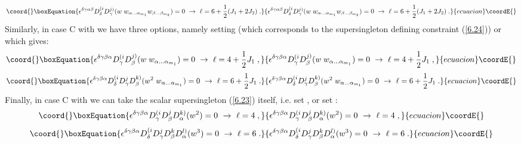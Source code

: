 \documentclass[a4paper,12pt]{article}
\begin{document}
\begin{equation}\coord{}\boxEquation{\label{6.3313}
 \epsilon^{\delta\gamma\alpha\beta}D^{(i}_\delta
D^{j)}_\gamma(w\;w_{\alpha\ldots\alpha_{m_1}} 
w_{\beta\ldots\beta_{m_2}}) = 0\ \rightarrow \ \ell = 6 +{1\over 
2}(J_1+2J_2)\;.
}{\epsilon^{\delta\gamma\alpha\beta}D^{(i}_\delta
D^{j)}_\gamma(w\;w_{\alpha\ldots\alpha_{m_1}} 
w_{\beta\ldots\beta_{m_2}}) = 0\ \rightarrow \ \ell = 6 +{1\over 
2}(J_1+2J_2)\;.
}{ecuacion}\coordE{}\end{equation}
Similarly, in case C with \coordHE{} we have three options, namely 
setting \coordHE{} (which 
corresponds to the supersingleton defining constraint 
(\ref{6.24})) or \coordHE{} which gives:
\begin{equation}\coord{}\boxEquation{\label{6.3314}
 \epsilon^{\delta\gamma\beta\alpha}D^{(i}_\gamma
D^{j)}_\beta(w\;w_{\alpha\ldots\alpha_{m_1}}) = 0\ \rightarrow \ 
\ell = 4 +{1\over 2}J_1\;,
}{\epsilon^{\delta\gamma\beta\alpha}D^{(i}_\gamma
D^{j)}_\beta(w\;w_{\alpha\ldots\alpha_{m_1}}) = 0\ \rightarrow \ 
\ell = 4 +{1\over 2}J_1\;,
}{ecuacion}\coordE{}\end{equation}
\begin{equation}\coord{}\boxEquation{\label{6.3315}
 \epsilon^{\delta\gamma\beta\alpha}D^{(i}_\delta D^j_\gamma
D^{k)}_\beta(w^2\;w_{\alpha\ldots\alpha_{m_1}}) = 0\ \rightarrow 
\ \ell = 6 +{1\over 2}J_1\;.
}{\epsilon^{\delta\gamma\beta\alpha}D^{(i}_\delta D^j_\gamma
D^{k)}_\beta(w^2\;w_{\alpha\ldots\alpha_{m_1}}) = 0\ \rightarrow 
\ \ell = 6 +{1\over 2}J_1\;.
}{ecuacion}\coordE{}\end{equation}
Finally, in case C with \coordHE{} we can take the scalar 
supersingleton (\ref{6.23}) itself, i.e. set \coordHE{}, or set \coordHE{}:
\begin{equation}\coord{}\boxEquation{\label{6.3316}
  \epsilon^{\delta\gamma\beta\alpha}D^{(i}_\gamma D^j_\beta
D^{k)}_\alpha(w^2) = 0\ \rightarrow \ \ell = 4\;,
}{\epsilon^{\delta\gamma\beta\alpha}D^{(i}_\gamma D^j_\beta
D^{k)}_\alpha(w^2) = 0\ \rightarrow \ \ell = 4\;,
}{ecuacion}\coordE{}\end{equation}
\begin{equation}\coord{}\boxEquation{\label{6.3317}
  \epsilon^{\delta\gamma\beta\alpha}D^{(i}_\delta D^j_\gamma
D^k_\beta D^{l)}_\alpha(w^3) = 0\ \rightarrow \ \ell = 6\;.
}{\epsilon^{\delta\gamma\beta\alpha}D^{(i}_\delta D^j_\gamma
D^k_\beta D^{l)}_\alpha(w^3) = 0\ \rightarrow \ \ell = 6\;.
}{ecuacion}\coordE{}\end{equation}
\end{document}
